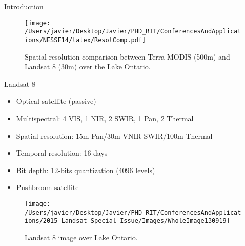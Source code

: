 \documentclass{beamer}
\begin{document}
\begin{frame}{}
\begin{columns}[t]
\begin{column}{.32\linewidth}
\begin{block}{Introduction}
\begin{center}
\begin{figure}[H]
\centering
  \texttt{[image: /Users/javier/Desktop/Javier/PHD\_RIT/ConferencesAndApplications/NESSF14/latex/ResolComp.pdf]}
  \caption{Spatial resolution comparison between Terra-MODIS (500m) and Landsat 8 (30m) over the Lake Ontario. \label{fig:resol} } 
\end{figure}
\end{center}
\end{block}
      

\begin{block}{Landsat 8}

\begin{itemize}
	\item Optical satellite (passive)
	\vspace{.2cm}
	\item Multispectral: 4 VIS, 1 NIR, 2 SWIR, 1 Pan, 2 Thermal
	\vspace{.2cm}
	\item Spatial resolution: 15m Pan/30m VNIR-SWIR/100m Thermal
	\vspace{.2cm}
	\item Temporal resolution: 16 days
	\vspace{.2cm}
	\item Bit depth: 12-bits quantization (4096 levels)
	\vspace{.2cm}
	\item Pushbroom satellite
\end{itemize}

\begin{figure}[htb]
  	\centering
  	\texttt{[image: /Users/javier/Desktop/Javier/PHD\_RIT/ConferencesAndApplications/2015\_Landsat\_Special\_Issue/Images/WholeImage130919]}
  \caption{Landsat 8 image over Lake Ontario. \label{fig:Scene} } 
\end{figure}


\end{block}
\end{column}
\end{columns}
\end{frame}
\end{document}
